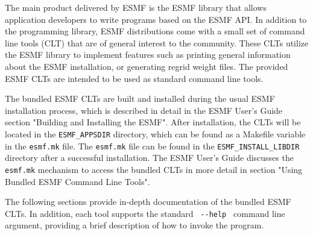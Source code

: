 
The main product delivered by ESMF is the ESMF library that allows application
developers to write programs based on the ESMF API. In addition to the 
programming library, ESMF distributions come with a small set of command line
tools (CLT) that are of general interest to the community. These CLTs utilize
the ESMF library to implement features such as printing general information
about the ESMF installation, or generating regrid weight files. The provided
ESMF CLTs are intended to be used as standard command line tools.

The bundled ESMF CLTs are built and installed during the usual ESMF 
installation process, which is described in detail in the ESMF User's Guide 
section "Building and Installing the ESMF". After installation, the
CLTs will be located in the {\tt ESMF\_APPSDIR} directory, which can 
be found as a Makefile variable in the {\tt esmf.mk} file. The {\tt esmf.mk} 
file can be found in the {\tt ESMF\_INSTALL\_LIBDIR} directory after a 
successful installation.  The ESMF User's Guide discusses the {\tt esmf.mk} 
mechanism to access the bundled CLTs in more detail in section 
"Using Bundled ESMF Command Line Tools".

The following sections provide in-depth documentation of the bundled ESMF 
CLTs. In addition, each tool supports the standard 
\verb+ --help + command line argument, providing a brief description of how 
to invoke the program.
